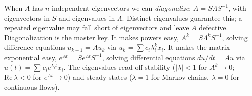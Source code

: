 When $A$ has $n$ independent eigenvectors we can \emph{diagonalize}: $A=S\Lambda S^{-1}$, with eigenvectors in $S$ and eigenvalues in $\Lambda$. Distinct eigenvalues guarantee this; a repeated eigenvalue may fall short of eigenvectors and leave $A$ defective. Diagonalization is the master key. It makes powers easy, $A^k=S\Lambda^k S^{-1}$, solving difference equations $u_{k+1}=Au_k$ via $u_k=\sum c_i\lambda_i^k x_i$. It makes the matrix exponential easy, $e^{At}=Se^{\Lambda t}S^{-1}$, solving differential equations $du/dt=Au$ via $u(t)=\sum c_i e^{\lambda_i t}x_i$. The eigenvalues read off stability ($|\lambda|<1$ for $A^k\to 0$; $\mathrm{Re}\,\lambda<0$ for $e^{At}\to 0$) and steady states ($\lambda=1$ for Markov chains, $\lambda=0$ for continuous flows).

